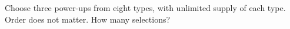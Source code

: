 Choose three power-ups from eight types, with unlimited supply of each type. Order does not matter. How many selections?
